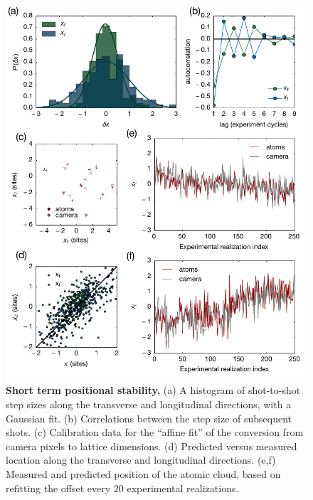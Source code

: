 \documentclass[twocolumn,aip,rsi,reprint,bibnotes]{revtex4-1}
\begin{document}
\begin{figure}
  \begin{center}
    \includegraphics[width=\columnwidth]{Figure13.pdf}
    \caption{\textbf{Short term positional stability.} (a) A histogram of shot-to-shot step sizes along the transverse and longitudinal directions, with a Gaussian fit. (b) Correlations between the step size of subsequent shots. (c) Calibration data for the ``affine fit'' of the conversion from camera pixels to lattice dimensions. (d) Predicted versus measured location along the transverse and longitudinal directions. (e,f) Measured  and predicted position of the atomic cloud, based on refitting the offset every $20$ experimental realizations.}\label{fig:stability}
  \end{center}
\end{figure}
\end{document}
